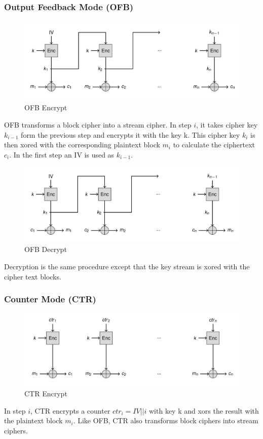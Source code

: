 \subsubsection{Output Feedback Mode (OFB)}
\begin{figure}[H]
  \centering
  \includegraphics[width=.8\textwidth]{figures/ofb_encrypt.png}
  \caption{OFB Encrypt}
\end{figure}
OFB transforms a block cipher into a stream cipher.
In step $i$, it takes cipher key $k_{i-1}$ form the previous step and encrypts it with the key k.
This cipher key $k_i$ is then xored with the corresponding plaintext block $m_i$ to calculate the ciphertext $c_i$.
In the first step an IV is used as $k_{i-1}$.

\begin{figure}[H]
  \centering
  \includegraphics[width=.8\textwidth]{figures/ofb_decrypt}
  \caption{OFB Decrypt}
\end{figure}
Decryption is the same procedure except that the key stream is xored with the cipher text blocks.

\subsubsection{Counter Mode (CTR)}
\begin{figure}[H]
  \centering
  \includegraphics[width=.8\textwidth]{figures/ctr_encrypt}
  \caption{CTR Encrypt}
\end{figure}
In step $i$, CTR encrypts a counter $ctr_i = IV || i$ with key k and xors the result with the plaintext block $m_i$.
Like OFB, CTR also transforms block ciphers into stream ciphers.

